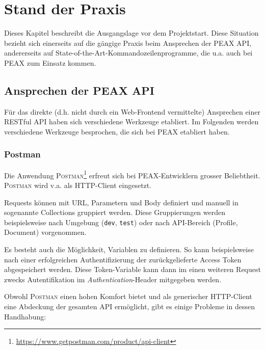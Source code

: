 \section{Stand der Praxis}

Dieses Kapitel beschreibt die Ausgangslage vor dem Projektstart. Diese Situation bezieht sich einerseits auf die gängige Praxis beim Ansprechen der PEAX API, andererseits auf State-of-the-Art-Kommandozeilenprogramme, die u.a. auch bei PEAX zum Einsatz kommen.

\subsection{Ansprechen der PEAX API}

Für das direkte (d.h. nicht durch ein Web-Frontend vermittelte) Ansprechen einer RESTful API haben sich verschiedene Werkzeuge etabliert. Im Folgenden werden verschiedene Werkzeuge besprochen, die sich bei PEAX etabliert haben.

\subsubsection{Postman}

Die Anwendung \textsc{Postman}\footnote{\url{https://www.getpostman.com/product/api-client}} erfreut sich bei PEAX-Entwicklern grosser Beliebtheit. \textsc{Postman} wird v.a. als HTTP-Client eingesetzt.

Requests können mit URL, Parametern und Body definiert und manuell in sogenannte Collections gruppiert werden. Diese Gruppierungen werden beispielsweise nach Umgebung (\texttt{dev}, \texttt{test}) oder nach API-Bereich (Profile, Document) vorgenommen.

Es besteht auch die Möglichkeit, Variablen zu definieren. So kann beispielsweise nach einer erfolgreichen Authentifizierung der zurückgelieferte Access Token abgespeichert werden. Diese Token-Variable kann dann im einen weiteren Request zwecks Autentifikation im \textit{Authentication}-Header mitgegeben werden.

Obwohl \textsc{Postman} einen hohen Komfort bietet und als generischer HTTP-Client eine Abdeckung der gesamten API ermöglicht, gibt es einige Probleme in dessen Handhabung:

